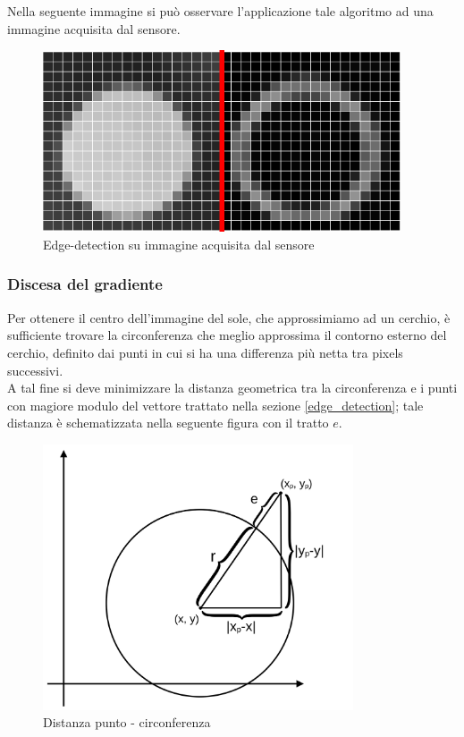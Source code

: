 \documentclass[12pt]{article}
\begin{document}
        
        Nella seguente immagine si può osservare l'applicazione tale algoritmo ad una immagine acquisita dal sensore.
        
        \begin{figure}[h]
        \centering
            \includegraphics[width=300pt]{Draws/default_image-gradient.png}
            \caption{Edge-detection su immagine acquisita dal sensore}
            \label{edge-detection_image_comparison}
        \end{figure}
        
        
        \subsubsection{Discesa del gradiente}\label{gradient_descent}
        Per ottenere il centro dell'immagine del sole, che approssimiamo ad un cerchio, è sufficiente trovare la circonferenza che meglio approssima il contorno esterno del cerchio, definito dai punti in cui si ha una differenza più netta tra pixels successivi. \\
        A tal fine si deve minimizzare la distanza geometrica tra la circonferenza e i punti con magiore modulo del vettore trattato nella sezione \ref{edge_detection}; tale distanza è schematizzata nella seguente figura con il tratto $ e $.

        \begin{figure}[h]
        \centering
            \includegraphics[width=260pt]{Draws/Discesa_del_gradiente_cerchio-punto.png}
            \caption{Distanza punto - circonferenza}
        \end{figure}
        
\end{document}
